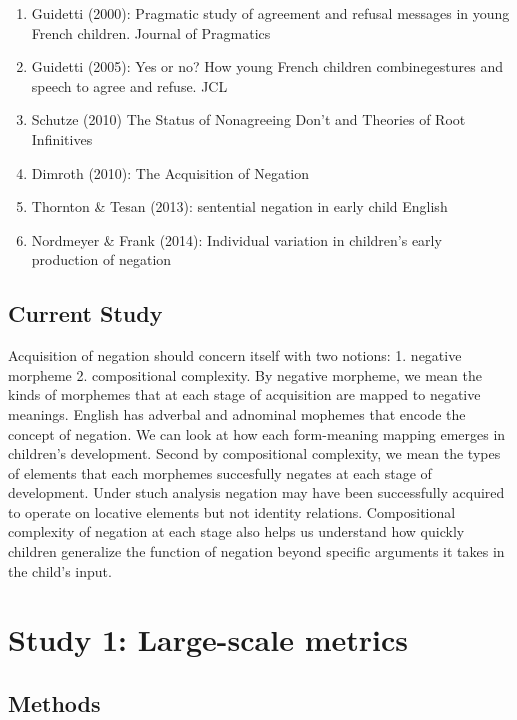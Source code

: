 \documentclass[man,floatsintext,draftall]{apa6}
\begin{document}
\begin{enumerate}
\item
  Guidetti (2000): Pragmatic study of agreement and refusal messages in young French children. Journal of Pragmatics
\item
  Guidetti (2005): Yes or no? How young French children combinegestures and speech to agree and refuse. JCL
\item
  Schutze (2010) The Status of Nonagreeing Don't and Theories of Root Infinitives
\item
  Dimroth (2010): The Acquisition of Negation
\item
  Thornton \& Tesan (2013): sentential negation in early child English
\item
  Nordmeyer \& Frank (2014): Individual variation in children's early production of negation
\end{enumerate}

\hypertarget{current-study}{%
\subsection{Current Study}\label{current-study}}

Acquisition of negation should concern itself with two notions: 1. negative morpheme 2. compositional complexity. By negative morpheme, we mean the kinds of morphemes that at each stage of acquisition are mapped to negative meanings. English has adverbal and adnominal mophemes that encode the concept of negation. We can look at how each form-meaning mapping emerges in children's development. Second by compositional complexity, we mean the types of elements that each morphemes succesfully negates at each stage of development. Under stuch analysis negation may have been successfully acquired to operate on locative elements but not identity relations. Compositional complexity of negation at each stage also helps us understand how quickly children generalize the function of negation beyond specific arguments it takes in the child's input.

\hypertarget{study-1-large-scale-metrics}{%
\section{Study 1: Large-scale metrics}\label{study-1-large-scale-metrics}}

\hypertarget{methods}{%
\subsection{Methods}\label{methods}}
\end{document}
